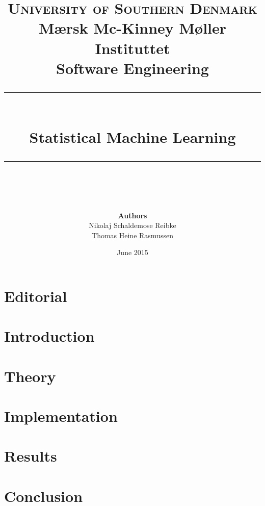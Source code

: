 \documentclass[11pt]{article}
\newcommand{\romanTitle}[1]{\MakeUppercase{\thepage}\hspace{0.2cm}#1}
\begin{document}
\title {
	\textsc{\LARGE University of Southern Denmark}\\
	\large Mærsk Mc-Kinney Møller Instituttet\\[1cm]
	\Large Software Engineering\\
	\rule{\linewidth}{0.4pt}\\[0.4cm]Statistical Machine Learning\\\rule{\linewidth}{0.4pt}\\[0.5cm] }

\author{ 
	\textbf{Authors}\\Nikolaj Schaldemose Reibke\\Thomas Heine Rasmussen
}
\date{\vfill June 2015}
\maketitle
\thispagestyle{empty}
\clearpage
\setcounter{page}{1}

\pagestyle{fancy}
\setlength{\headheight}{25.2pt} 


\rfoot{}
\cfoot{\MakeUppercase{\thepage}}
\lfoot{}

\section*{Editorial}

\newpage

\renewcommand\contentsname{\romanTitle{Table of contents}}
\tableofcontents
\newpage

\setcounter{page}{1}
\rfoot{}
\lfoot{}

\section{Introduction}


\section{Theory}


\section{Implementation}


\section{Results}


\section{Conclusion}

\end{document}
